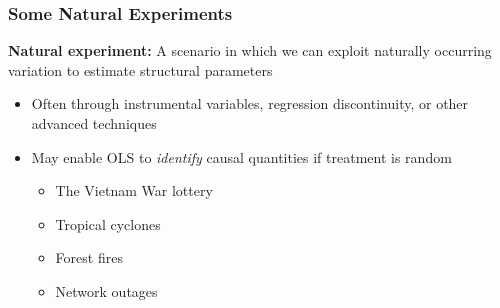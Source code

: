 \documentclass[12pt, block=fill]{beamer}
\begin{document}
\begin{frame}
  \frametitle{Some Natural Experiments}
  
  \textbf{Natural experiment:} A scenario in which we can exploit
  naturally occurring variation to estimate structural parameters 
  
  \begin{itemize}
  \item Often through instrumental variables, regression discontinuity,
    or other advanced techniques  
  \item May enable OLS to \textit{identify} causal quantities if
    treatment is random
    
    \begin{itemize}
    \item The Vietnam War lottery
    \item Tropical cyclones
    \item Forest fires
    \item Network outages
    \end{itemize}
  \end{itemize}
  
\end{frame}
\end{document}
